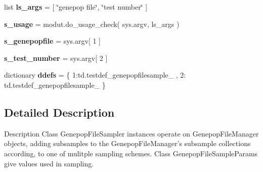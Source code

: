 \begin{DoxyCompactItemize}
\item 
list {\bfseries ls\+\_\+args} = \mbox{[} \char`\"{}genepop file\char`\"{}, \char`\"{}test number\char`\"{} \mbox{]}\hypertarget{namespacenegui_1_1genepopfilesampler_af0949cf58ac4626034b74cc9feaf35de}{}\label{namespacenegui_1_1genepopfilesampler_af0949cf58ac4626034b74cc9feaf35de}

\item 
{\bfseries s\+\_\+usage} = modut.\+do\+\_\+usage\+\_\+check( sys.\+argv, ls\+\_\+args )\hypertarget{namespacenegui_1_1genepopfilesampler_a50569ca2f7b58beeb1163ff3e3578bc6}{}\label{namespacenegui_1_1genepopfilesampler_a50569ca2f7b58beeb1163ff3e3578bc6}

\item 
{\bfseries s\+\_\+genepopfile} = sys.\+argv\mbox{[} 1 \mbox{]}\hypertarget{namespacenegui_1_1genepopfilesampler_a950ccfdc83d7493167c08843392ce46c}{}\label{namespacenegui_1_1genepopfilesampler_a950ccfdc83d7493167c08843392ce46c}

\item 
{\bfseries s\+\_\+test\+\_\+number} = sys.\+argv\mbox{[} 2 \mbox{]}\hypertarget{namespacenegui_1_1genepopfilesampler_adc2001c9e9a7d948254b3cdc332a6977}{}\label{namespacenegui_1_1genepopfilesampler_adc2001c9e9a7d948254b3cdc332a6977}

\item 
dictionary {\bfseries ddefs} = \{ 1\+:td.\+testdef\+\_\+genepopfilesample\+\_ , 2\+: td.\+testdef\+\_\+genepopfilesample\+\_ \}\hypertarget{namespacenegui_1_1genepopfilesampler_a05caff4e04dff14a4594c4696dbd2496}{}\label{namespacenegui_1_1genepopfilesampler_a05caff4e04dff14a4594c4696dbd2496}

\end{DoxyCompactItemize}


\subsection{Detailed Description}
\begin{DoxyVerb}Description
Class GenepopFileSampler instances operate on GenepopFileManager objects,
adding subsamples to the GenepopFileManager's subsample collections according,
to one of mulitple sampling schemes.  Class GenepopFileSampleParams give 
values used in sampling.
\end{DoxyVerb}
 